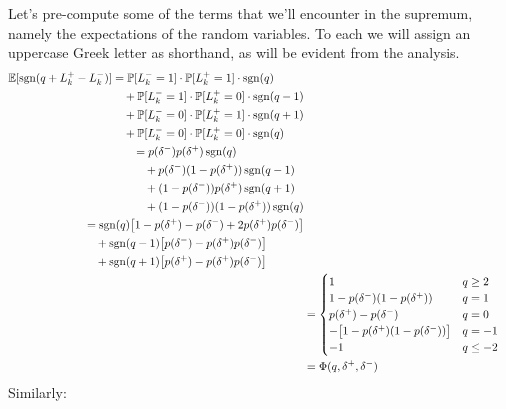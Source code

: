 Let's pre-compute some of the terms that we'll encounter in the supremum, namely the expectations of the random variables. To each we will assign an uppercase Greek letter as shorthand, as will be evident from the analysis.
\begin{align}
\begin{split}
\mathbb{E} [\operatorname{\mathrm{sgn}}(q + L_k^+ - L_k^-)] & = \mathbb{P}[L_k^- = 1] \cdot \mathbb{P}[L_k^+ = 1] \cdot \operatorname{\mathrm{sgn}}(q) \\
& \quad + \mathbb{P}[L_k^- = 1] \cdot \mathbb{P}[L_k^+ = 0] \cdot \operatorname{\mathrm{sgn}}(q - 1) \\
& \quad +  \mathbb{P}[L_k^- = 0] \cdot \mathbb{P}[L_k^+ = 1] \cdot \operatorname{\mathrm{sgn}}(q+1) \\
& \quad + \mathbb{P}[L_k^- = 0] \cdot \mathbb{P}[L_k^+ = 0] \cdot \operatorname{\mathrm{sgn}}(q) 
\end{split} \\
\begin{split}
& = p(\delta^-)p(\delta^+) \operatorname{\mathrm{sgn}}(q)  \\
& \quad + p(\delta^-) (1-p(\delta^+)) \operatorname{\mathrm{sgn}}(q - 1)  \\
& \quad + (1 - p(\delta^-)) p(\delta^+)  \operatorname{\mathrm{sgn}}(q+1)  \\
& \quad + (1 - p(\delta^-)) (1-p(\delta^+))  \operatorname{\mathrm{sgn}}(q)
\end{split} \\
\begin{split}
& = \operatorname{\mathrm{sgn}}(q) \bigl[ 1 - p(\delta^+) - p(\delta^-) + 2 p(\delta^+) p(\delta^-) \bigr] \\
& \quad + \operatorname{\mathrm{sgn}}(q-1) \bigl[ p(\delta^-)  - p(\delta^+) p(\delta^-) \bigr] \\
& \quad + \operatorname{\mathrm{sgn}}(q+1) \bigl[ p(\delta^+)  - p(\delta^+) p(\delta^-) \bigr]
\end{split} \\
& = \begin{cases} 
1 & q \geq 2 \\
1 - p(\delta^-)(1 - p(\delta^+)) & q = 1 \\
p(\delta^+) - p(\delta^-) & q = 0 \\
-\bigl[ 1 - p(\delta^+)(1 - p(\delta^-)) \bigr] & q = -1 \\
-1 & q \leq -2
\end{cases} \\
& = \Phi(q, \delta^+, \delta^-)
\end{align}
Similarly:
